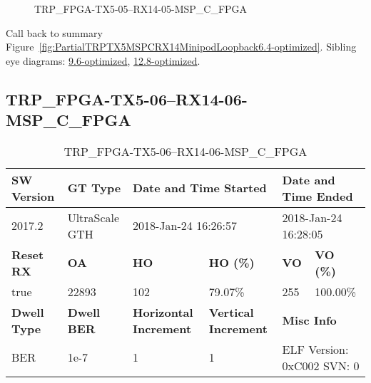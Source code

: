 \begin{figure}[h]
\caption{TRP\_FPGA-TX5-05--RX14-05-MSP\_C\_FPGA} \label{fig:TRPFPGATX505RX1405MSPCFPGA6.4-optimized}
\end{figure}

Call back to summary Figure~\ref{fig:PartialTRPTX5MSPCRX14MinipodLoopback6.4-optimized}.
Sibling eye diagrams: \hyperref[sec:TRPFPGATX505RX1405MSPCFPGA9.6-optimized]{9.6-optimized}, \hyperref[sec:TRPFPGATX505RX1405MSPCFPGA12.8-optimized]{12.8-optimized}.

\clearpage
\newpage


\subsection{TRP\_FPGA-TX5-06--RX14-06-MSP\_C\_FPGA}\label{sec:TRPFPGATX506RX1406MSPCFPGA6.4-optimized}

\begin{table}[h]
\centering
\caption{TRP\_FPGA-TX5-06--RX14-06-MSP\_C\_FPGA}
\label{tab:TRPFPGATX506RX1406MSPCFPGA6.4-optimized}
\begin{tabular}{@{}|l|l|l|l|l|l|@{}}
\toprule
\textbf{SW Version}                & \textbf{GT Type}   & \multicolumn{2}{l|}{\textbf{Date and Time Started}}            & \multicolumn{2}{l|}{\textbf{Date and Time Ended}}        \\ \midrule
2017.2                       & UltraScale GTH          & \multicolumn{2}{l|}{2018-Jan-24 16:26:57}                   & \multicolumn{2}{l|}{2018-Jan-24 16:28:05}               \\ \midrule
\textbf{Reset RX}                  & \textbf{OA} & \textbf{HO}   & \textbf{HO (\%)} & \textbf{VO} & \textbf{VO (\%)} \\ \midrule
true & 22893        & 102          & 79.07\%        & 255        & 100.00\%       \\ \midrule
\textbf{Dwell Type}                & \textbf{Dwell BER} & \textbf{Horizontal Increment} & \textbf{Vertical Increment}    & \multicolumn{2}{l|}{\textbf{Misc Info}}                  \\ \midrule
BER                            & 1e-7        & 1        & 1           & \multicolumn{2}{l|}{ELF Version: 0xC002 SVN: 0}                         \\ \bottomrule
\end{tabular}
\end{table}


